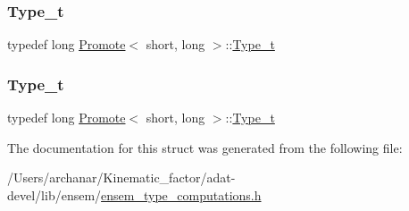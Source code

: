 \subsubsection{\texorpdfstring{Type\_t}{Type\_t}\hspace{0.1cm}{\footnotesize\ttfamily [2/3]}}
{\footnotesize\ttfamily typedef long \mbox{\hyperlink{structPromote}{Promote}}$<$ short, long $>$\+::\mbox{\hyperlink{structPromote_3_01short_00_01long_01_4_a46884a4f8850dbebc27c57717668957b}{Type\+\_\+t}}}

\mbox{\label{structPromote_3_01short_00_01long_01_4_a46884a4f8850dbebc27c57717668957b}} 
\subsubsection{\texorpdfstring{Type\_t}{Type\_t}\hspace{0.1cm}{\footnotesize\ttfamily [3/3]}}
{\footnotesize\ttfamily typedef long \mbox{\hyperlink{structPromote}{Promote}}$<$ short, long $>$\+::\mbox{\hyperlink{structPromote_3_01short_00_01long_01_4_a46884a4f8850dbebc27c57717668957b}{Type\+\_\+t}}}



The documentation for this struct was generated from the following file\+:\begin{DoxyCompactItemize}
\item 
/\+Users/archanar/\+Kinematic\+\_\+factor/adat-\/devel/lib/ensem/\mbox{\hyperlink{adat-devel_2lib_2ensem_2ensem__type__computations_8h}{ensem\+\_\+type\+\_\+computations.\+h}}\end{DoxyCompactItemize}
